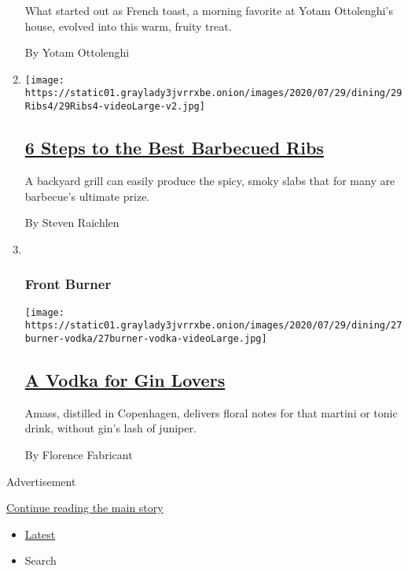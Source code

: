 \begin{enumerate}
  What started out as French toast, a morning favorite at Yotam
  Ottolenghi's house, evolved into this warm, fruity treat.

  By Yotam Ottolenghi
\item
  \texttt{[image: https://static01.graylady3jvrrxbe.onion/images/2020/07/29/dining/29Ribs4/29Ribs4-videoLarge-v2.jpg]}

  \hypertarget{6-steps-to-the-best-barbecued-ribs}{%
  \subsection{\texorpdfstring{\href{/2020/07/24/dining/bbq-ribs-recipe.html}{6
  Steps to the Best Barbecued
  Ribs}}{6 Steps to the Best Barbecued Ribs}}\label{6-steps-to-the-best-barbecued-ribs}}

  A backyard grill can easily produce the spicy, smoky slabs that for
  many are barbecue's ultimate prize.

  By Steven Raichlen
\item ~
  \hypertarget{front-burner}{%
  \subsubsection{Front Burner}\label{front-burner}}

  \texttt{[image: https://static01.graylady3jvrrxbe.onion/images/2020/07/29/dining/27burner-vodka/27burner-vodka-videoLarge.jpg]}

  \hypertarget{a-vodka-for-gin-lovers}{%
  \subsection{\texorpdfstring{\href{/2020/07/27/dining/amass-vodka.html}{A
  Vodka for Gin
  Lovers}}{A Vodka for Gin Lovers}}\label{a-vodka-for-gin-lovers}}

  Amass, distilled in Copenhagen, delivers floral notes for that martini
  or tonic drink, without gin's lash of juniper.

  By Florence Fabricant
\end{enumerate}

Advertisement

\protect\hyperlink{after-mid1}{Continue reading the main story}

\begin{itemize}
\tightlist
\item
  \protect\hyperlink{stream-panel}{Latest}
\item
  Search
\end{itemize}

